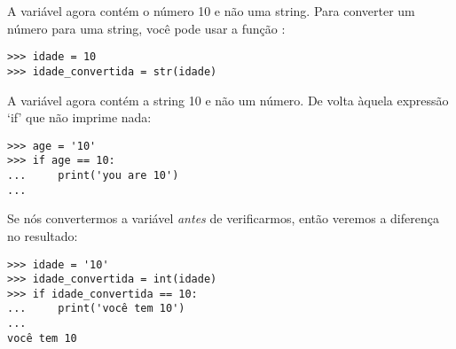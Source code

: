 \noindent
A variável  agora contém o número 10 e não uma string. Para converter um número para uma string, você pode usar a função :

\begin{listing}
\begin{verbatim}
>>> idade = 10
>>> idade_convertida = str(idade)
\end{verbatim}
\end{listing}

\noindent
A variável  agora contém a string 10 e não um número. De volta àquela expressão `if' que não imprime nada:

\begin{listing}
\begin{verbatim}
>>> age = '10'
>>> if age == 10:
...     print('you are 10')
...
\end{verbatim}
\end{listing}

\noindent
Se nós convertermos a variável \emph{antes} de verificarmos, então veremos a diferença no resultado:

\begin{listing}
\begin{verbatim}
>>> idade = '10'
>>> idade_convertida = int(idade)
>>> if idade_convertida == 10:
...     print('você tem 10')
...
você tem 10
\end{verbatim}
\end{listing}

\newpage
